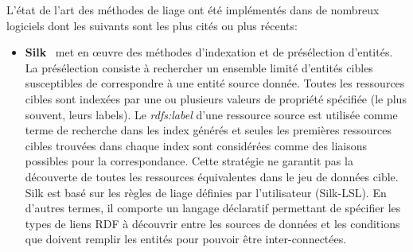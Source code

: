L'état de l'art des méthodes de liage ont été implémentés dans de nombreux logiciels dont les suivants sont les plus cités ou plus récents:


\begin{itemize}

\item \textbf{Silk}~\cite{Jentzsch} met en œuvre des méthodes d'indexation et de présélection d'entités. La présélection consiste à rechercher un ensemble limité d’entités cibles susceptibles de correspondre à une entité source donnée. Toutes les ressources cibles sont indexées par une ou plusieurs valeurs de propriété spécifiée (le plus souvent, leurs labels). Le \textit{rdfs:label} d'une ressource source est utilisée comme terme de recherche dans les index générés et seules les premières ressources cibles trouvées dans chaque index sont considérées comme des liaisons possibles pour la correspondance. Cette stratégie ne garantit pas la découverte de toutes les ressources équivalentes dans le jeu de données cible. Silk est basé sur les règles de liage définies par l'utilisateur (Silk-LSL). En d'autres termes, il comporte un langage déclaratif permettant de spécifier les types de liens RDF à découvrir entre les sources de données et les conditions que doivent remplir les entités pour pouvoir être inter-connectées.\\


\end{itemize}
